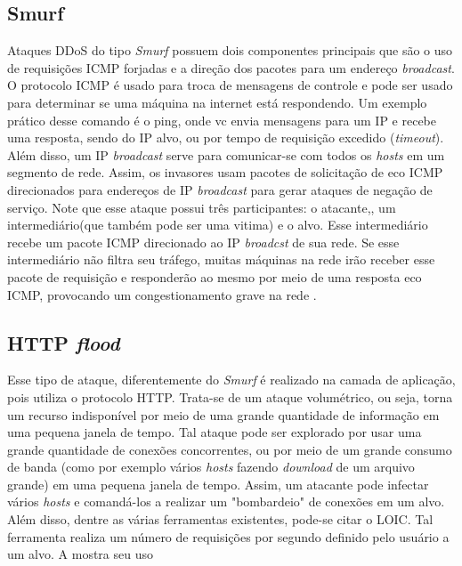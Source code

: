 \subsection{Smurf}
Ataques DDoS do tipo \textit{Smurf} possuem dois componentes principais que são o uso de requisições ICMP forjadas e a direção dos pacotes para um endereço \textit{broadcast}. O protocolo ICMP é usado para troca de mensagens de controle e pode ser usado para determinar se uma máquina na internet está respondendo. Um exemplo prático desse comando é o ping, onde vc envia mensagens para um IP e recebe uma resposta, sendo do IP alvo, ou por tempo de requisição excedido (\textit{timeout}). Além disso, um IP \textit{broadcast} serve para comunicar-se com todos os \textit{hosts} em um segmento de rede. Assim, os invasores usam pacotes de solicitação de eco ICMP direcionados para endereços de IP \textit{broadcast} para gerar ataques de negação de serviço. Note que esse ataque possui três participantes: o atacante,, um intermediário(que também pode ser uma vitima) e o alvo. Esse intermediário recebe um pacote ICMP direcionado ao IP \textit{broadcst} de sua rede. Se esse intermediário não filtra seu tráfego, muitas máquinas na rede irão receber esse pacote de requisição e responderão ao mesmo por meio de uma resposta eco ICMP, provocando um congestionamento grave na rede \cite{certSmurf}.
\subsection{HTTP \textit{flood}}
Esse tipo de ataque, diferentemente do \textit{Smurf} é realizado na camada de aplicação, pois utiliza o protocolo HTTP. Trata-se de um ataque volumétrico, ou seja, torna um recurso indisponível por meio de uma grande quantidade de informação em uma pequena janela de tempo. Tal ataque pode ser explorado por  usar uma grande quantidade de conexões concorrentes, ou por meio de um grande consumo de banda (como por exemplo vários \textit{hosts} fazendo \textit{download} de um arquivo grande) em uma pequena janela de tempo. Assim, um atacante pode infectar vários \textit{hosts} e comandá-los a realizar um "bombardeio" de conexões em um alvo. Além disso, dentre as várias ferramentas existentes, pode-se citar o LOIC. Tal ferramenta realiza um número de requisições por segundo definido pelo usuário a um alvo. A  mostra seu uso 
 
